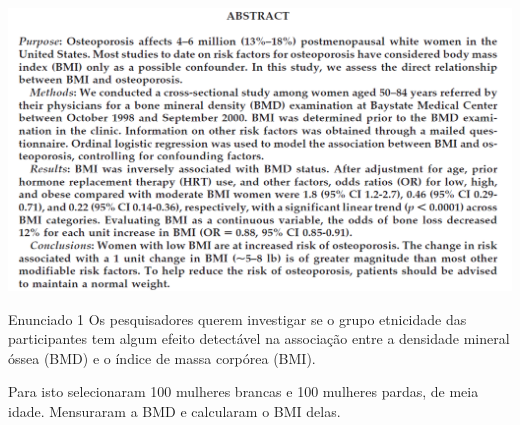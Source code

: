 \documentclass{beamer}
\begin{document}
\begin{frame}{}
  \begin{center}
    \includegraphics[width=1.175\textwidth]{Cap18-19/bmi-bmd-abstract}
  \end{center}
\end{frame}

\begin{frame}
  \begin{exampleblock}{Enunciado 1}
    \small
    Os pesquisadores querem investigar se o grupo etnicidade das participantes tem algum efeito detectável na associação entre
    a densidade mineral óssea (BMD) e o índice de massa corpórea (BMI).

    \bigskip
    \begin{exampleblock}{}
    Para isto selecionaram 100 mulheres brancas e 100 mulheres pardas, de meia idade.
    Mensuraram a BMD e calcularam o BMI delas.
  \end{exampleblock}

  \end{exampleblock}
\end{frame}
\end{document}
